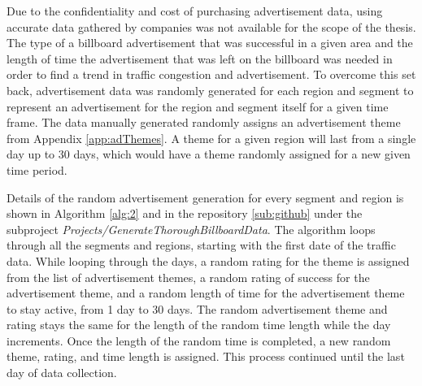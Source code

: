 \documentclass[titlepage,twocolumn]{article}
\begin{document}
\par Due to the confidentiality and cost of purchasing advertisement data, using accurate data gathered by companies was not available for the scope of the thesis. The type of a billboard advertisement that was successful in a given area and the length of time the advertisement that was left on the billboard was needed in order to find a trend in traffic congestion and advertisement. To overcome this set back, advertisement data was randomly generated for each region and segment to represent an advertisement for the region and segment itself for a given time frame. The data manually generated randomly assigns an advertisement theme from Appendix \ref{app:adThemes}. A theme for a given region will last from a single day up to 30 days, which would have a theme randomly assigned for a new given time period. 
\par Details of the random advertisement generation for every segment and region is shown in Algorithm \ref{alg:2} and in the repository \ref{sub:github} under the subproject \textit{Projects/GenerateThoroughBillboardData}. The algorithm loops through all the segments and regions, starting with the first date of the traffic data. While looping through the days, a random rating for the theme is assigned from the list of advertisement themes, a random rating of success for the advertisement theme, and a random length of time for the advertisement theme to stay active, from 1 day to 30 days. The random advertisement theme and rating stays the same for the length of the random time length while the day increments. Once the length of the random time is completed, a new random theme, rating, and time length is assigned. This process continued until the last day of data collection. 
\end{document}
